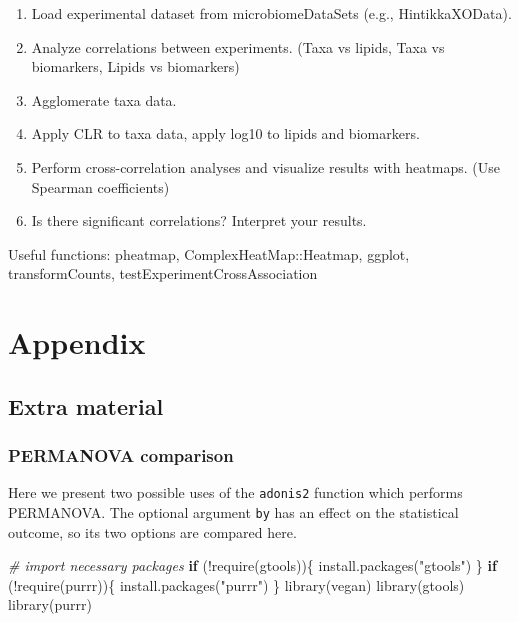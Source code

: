 \documentclass[
]{book}
\newenvironment{Shaded}{\begin{snugshade}}{\end{snugshade}}
\newcommand{\CommentTok}[1]{\textcolor[rgb]{0.56,0.35,0.01}{\textit{#1}}}
\newcommand{\ControlFlowTok}[1]{\textcolor[rgb]{0.13,0.29,0.53}{\textbf{#1}}}
\newcommand{\FunctionTok}[1]{\textcolor[rgb]{0.00,0.00,0.00}{#1}}
\newcommand{\NormalTok}[1]{#1}
\newcommand{\SpecialCharTok}[1]{\textcolor[rgb]{0.00,0.00,0.00}{#1}}
\newcommand{\StringTok}[1]{\textcolor[rgb]{0.31,0.60,0.02}{#1}}
\providecommand{\tightlist}{%
  \setlength{\itemsep}{0pt}\setlength{\parskip}{0pt}}
\begin{document}
\begin{enumerate}
\def\labelenumi{\arabic{enumi}.}
\tightlist
\item
  Load experimental dataset from microbiomeDataSets (e.g., HintikkaXOData).
\item
  Analyze correlations between experiments. (Taxa vs lipids, Taxa vs biomarkers, Lipids vs biomarkers)
\item
  Agglomerate taxa data.
\item
  Apply CLR to taxa data, apply log10 to lipids and biomarkers.
\item
  Perform cross-correlation analyses and visualize results with heatmaps. (Use Spearman coefficients)
\item
  Is there significant correlations? Interpret your results.
\end{enumerate}

Useful functions: pheatmap, ComplexHeatMap::Heatmap, ggplot, transformCounts, testExperimentCrossAssociation

\hypertarget{part-appendix}{%
\part{Appendix}\label{part-appendix}}

\hypertarget{extras}{%
\chapter{Extra material}\label{extras}}

\hypertarget{permanova-comparison}{%
\section{PERMANOVA comparison}\label{permanova-comparison}}

Here we present two possible uses of the \texttt{adonis2} function which performs PERMANOVA. The
optional argument \texttt{by} has an effect on the statistical outcome, so its two options are
compared here.

\begin{Shaded}
\begin{Highlighting}[]
\CommentTok{\# import necessary packages}
\ControlFlowTok{if}\NormalTok{ (}\SpecialCharTok{!}\FunctionTok{require}\NormalTok{(gtools))\{}
  \FunctionTok{install.packages}\NormalTok{(}\StringTok{"gtools"}\NormalTok{)  }
\NormalTok{\}}
\ControlFlowTok{if}\NormalTok{ (}\SpecialCharTok{!}\FunctionTok{require}\NormalTok{(purrr))\{}
  \FunctionTok{install.packages}\NormalTok{(}\StringTok{"purrr"}\NormalTok{)  }
\NormalTok{\}}
\FunctionTok{library}\NormalTok{(vegan)}
\FunctionTok{library}\NormalTok{(gtools)}
\FunctionTok{library}\NormalTok{(purrr)}
\end{Highlighting}
\end{Shaded}
\end{document}
